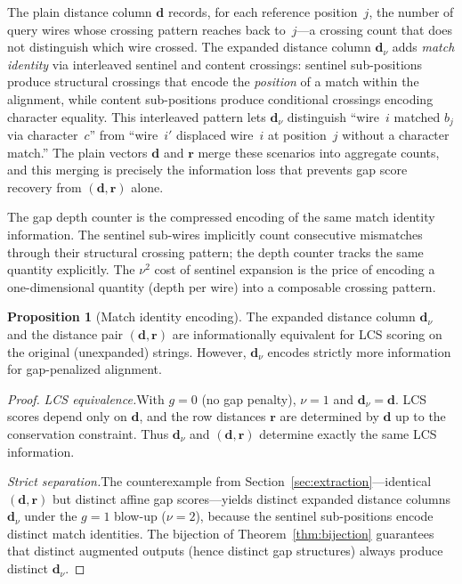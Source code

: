 \documentclass[11pt, a4paper]{article}
\theoremstyle{definition}
\newtheorem{proposition}[theorem]{Proposition}
\theoremstyle{remark}
\newcommand{\dcol}{\mathbf{d}}
\newcommand{\drow}{\mathbf{r}}
\begin{document}
The plain distance column $\dcol$ records, for each reference
position~$j$, the number of query wires whose crossing pattern
reaches back to~$j$---a crossing count that does not distinguish
which wire crossed.
The expanded distance column $\dcol_\nu$
adds \emph{match identity} via interleaved sentinel and content
crossings: sentinel sub-positions produce structural crossings
that encode the \emph{position} of a match within the alignment,
while content sub-positions produce conditional crossings
encoding character equality.
This interleaved pattern lets
$\dcol_\nu$ distinguish ``wire~$i$ matched $b_j$ via
character~$c$'' from ``wire~$i'$ displaced wire~$i$ at
position~$j$ without a character match.''  The plain vectors
$\dcol$ and $\drow$ merge these scenarios into aggregate counts,
and this merging is precisely the information loss that prevents
gap score recovery from $(\dcol, \drow)$ alone.

The gap depth counter is the compressed encoding of the same
match identity information.
The sentinel sub-wires implicitly
count consecutive mismatches through their structural crossing
pattern; the depth counter tracks the same quantity explicitly.
The $\nu^2$ cost of sentinel expansion is the price of encoding
a one-dimensional quantity (depth per wire) into a composable
crossing pattern.

\begin{proposition}[Match identity encoding]
\label{prop:identity}
The expanded distance column $\dcol_\nu$ and the distance pair
$(\dcol, \drow)$ are informationally equivalent for LCS scoring
on the original (unexpanded) strings.
However, $\dcol_\nu$
encodes strictly more information for gap-penalized alignment.
\end{proposition}

\begin{proof}
\emph{LCS equivalence.}\enspace  With $g = 0$ (no gap penalty),
$\nu = 1$ and $\dcol_\nu = \dcol$.
LCS scores depend only on
$\dcol$, and the row distances $\drow$ are determined by $\dcol$
up to the conservation constraint.
Thus $\dcol_\nu$ and
$(\dcol, \drow)$ determine exactly the same LCS information.

\emph{Strict separation.}\enspace  The counterexample from
Section~\ref{sec:extraction}---identical $(\dcol, \drow)$ but
distinct affine gap scores---yields distinct expanded distance
columns $\dcol_\nu$ under the $g{=}1$ blow-up ($\nu{=}2$),
because the sentinel sub-positions encode distinct match
identities.
The bijection of Theorem~\ref{thm:bijection}
guarantees that distinct augmented outputs (hence distinct gap
structures) always produce distinct $\dcol_\nu$.
\end{proof}
\end{document}

